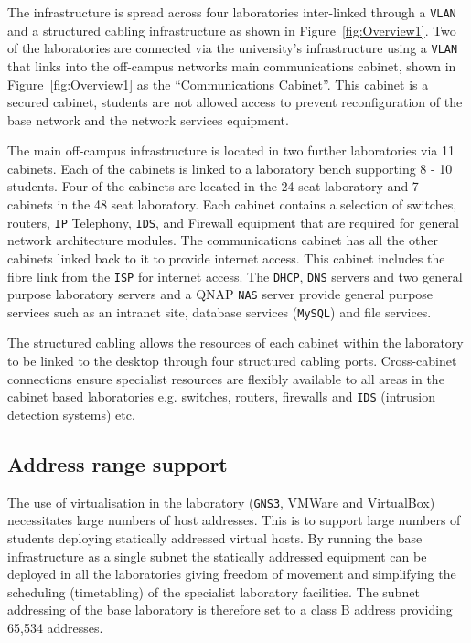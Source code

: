 The infrastructure is spread across four laboratories inter-linked through a \texttt{VLAN} and a structured cabling infrastructure as shown in Figure~\ref{fig:Overview1}. Two of the laboratories are connected via the university's infrastructure using a \texttt{VLAN} that links into the off-campus networks main communications cabinet, shown in Figure~\ref{fig:Overview1} as the ``Communications Cabinet''. This cabinet is a secured cabinet, students are not allowed access to prevent reconfiguration of the base network and the network services equipment.

The main off-campus infrastructure is located in two further laboratories via 11 cabinets. Each of the cabinets is linked to a laboratory bench supporting 8 - 10 students. Four of the cabinets are located in the 24 seat laboratory and 7 cabinets in the 48 seat laboratory. Each cabinet contains a selection of switches, routers, \texttt{IP} Telephony, \texttt{IDS}, and Firewall equipment that are required for general network architecture modules. The communications cabinet has all the other cabinets linked back to it to provide internet access. This cabinet includes the fibre link from the \texttt{ISP} for internet access. The \texttt{DHCP}, \texttt{DNS} servers and two general purpose laboratory servers and a QNAP \texttt{NAS} server provide general purpose services such as an intranet site, database services (\texttt{MySQL}) and file services. 

The structured cabling allows the resources of each cabinet within the laboratory to be linked to the desktop through four structured cabling ports. Cross-cabinet connections ensure specialist resources are flexibly available to all areas in the cabinet based laboratories e.g. switches, routers, firewalls and \texttt{IDS} (intrusion detection systems) etc.

\subsection{Address range support}
The use of virtualisation in the laboratory (\texttt{GNS3}, VMWare and VirtualBox) necessitates large numbers of host addresses. This is to support large numbers of students deploying statically addressed virtual hosts. By running the base infrastructure as a single subnet the statically addressed equipment can be deployed in all the laboratories giving freedom of movement and simplifying the scheduling (timetabling) of the specialist laboratory facilities. The subnet addressing of the base laboratory is therefore set to a class B address providing 65,534 addresses.

